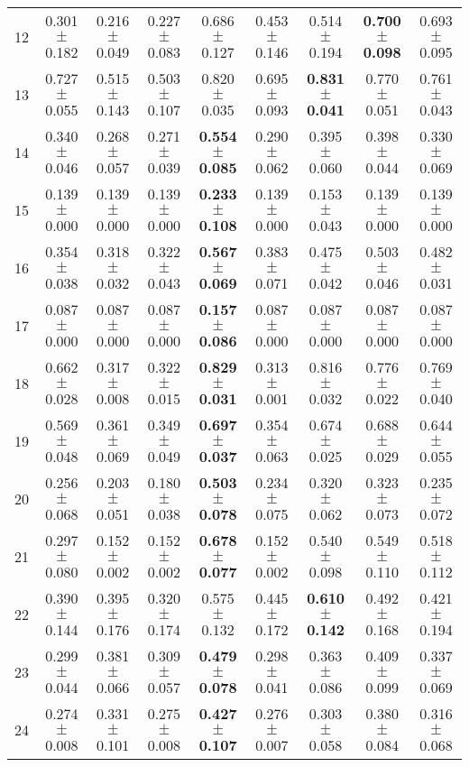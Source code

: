 \begin{table}[!ht]
{\begin{tabular}{r c c c c c c c c}
12 & 0.301 $\pm$ 0.182 & 0.216 $\pm$ 0.049 & 0.227 $\pm$ 0.083 & 0.686 $\pm$ 0.127 & 0.453 $\pm$ 0.146 & 0.514 $\pm$ 0.194 & \textbf{0.700 $\pm$ 0.098} & 0.693 $\pm$ 0.095 \\
13 & 0.727 $\pm$ 0.055 & 0.515 $\pm$ 0.143 & 0.503 $\pm$ 0.107 & 0.820 $\pm$ 0.035 & 0.695 $\pm$ 0.093 & \textbf{0.831 $\pm$ 0.041} & 0.770 $\pm$ 0.051 & 0.761 $\pm$ 0.043 \\
14 & 0.340 $\pm$ 0.046 & 0.268 $\pm$ 0.057 & 0.271 $\pm$ 0.039 & \textbf{0.554 $\pm$ 0.085} & 0.290 $\pm$ 0.062 & 0.395 $\pm$ 0.060 & 0.398 $\pm$ 0.044 & 0.330 $\pm$ 0.069 \\
15 & 0.139 $\pm$ 0.000 & 0.139 $\pm$ 0.000 & 0.139 $\pm$ 0.000 & \textbf{0.233 $\pm$ 0.108} & 0.139 $\pm$ 0.000 & 0.153 $\pm$ 0.043 & 0.139 $\pm$ 0.000 & 0.139 $\pm$ 0.000 \\
16 & 0.354 $\pm$ 0.038 & 0.318 $\pm$ 0.032 & 0.322 $\pm$ 0.043 & \textbf{0.567 $\pm$ 0.069} & 0.383 $\pm$ 0.071 & 0.475 $\pm$ 0.042 & 0.503 $\pm$ 0.046 & 0.482 $\pm$ 0.031 \\
17 & 0.087 $\pm$ 0.000 & 0.087 $\pm$ 0.000 & 0.087 $\pm$ 0.000 & \textbf{0.157 $\pm$ 0.086} & 0.087 $\pm$ 0.000 & 0.087 $\pm$ 0.000 & 0.087 $\pm$ 0.000 & 0.087 $\pm$ 0.000 \\
18 & 0.662 $\pm$ 0.028 & 0.317 $\pm$ 0.008 & 0.322 $\pm$ 0.015 & \textbf{0.829 $\pm$ 0.031} & 0.313 $\pm$ 0.001 & 0.816 $\pm$ 0.032 & 0.776 $\pm$ 0.022 & 0.769 $\pm$ 0.040 \\
19 & 0.569 $\pm$ 0.048 & 0.361 $\pm$ 0.069 & 0.349 $\pm$ 0.049 & \textbf{0.697 $\pm$ 0.037} & 0.354 $\pm$ 0.063 & 0.674 $\pm$ 0.025 & 0.688 $\pm$ 0.029 & 0.644 $\pm$ 0.055 \\
20 & 0.256 $\pm$ 0.068 & 0.203 $\pm$ 0.051 & 0.180 $\pm$ 0.038 & \textbf{0.503 $\pm$ 0.078} & 0.234 $\pm$ 0.075 & 0.320 $\pm$ 0.062 & 0.323 $\pm$ 0.073 & 0.235 $\pm$ 0.072 \\
21 & 0.297 $\pm$ 0.080 & 0.152 $\pm$ 0.002 & 0.152 $\pm$ 0.002 & \textbf{0.678 $\pm$ 0.077} & 0.152 $\pm$ 0.002 & 0.540 $\pm$ 0.098 & 0.549 $\pm$ 0.110 & 0.518 $\pm$ 0.112 \\
22 & 0.390 $\pm$ 0.144 & 0.395 $\pm$ 0.176 & 0.320 $\pm$ 0.174 & 0.575 $\pm$ 0.132 & 0.445 $\pm$ 0.172 & \textbf{0.610 $\pm$ 0.142} & 0.492 $\pm$ 0.168 & 0.421 $\pm$ 0.194 \\
23 & 0.299 $\pm$ 0.044 & 0.381 $\pm$ 0.066 & 0.309 $\pm$ 0.057 & \textbf{0.479 $\pm$ 0.078} & 0.298 $\pm$ 0.041 & 0.363 $\pm$ 0.086 & 0.409 $\pm$ 0.099 & 0.337 $\pm$ 0.069 \\
24 & 0.274 $\pm$ 0.008 & 0.331 $\pm$ 0.101 & 0.275 $\pm$ 0.008 & \textbf{0.427 $\pm$ 0.107} & 0.276 $\pm$ 0.007 & 0.303 $\pm$ 0.058 & 0.380 $\pm$ 0.084 & 0.316 $\pm$ 0.068 \\

\end{tabular}}
\end{table}
